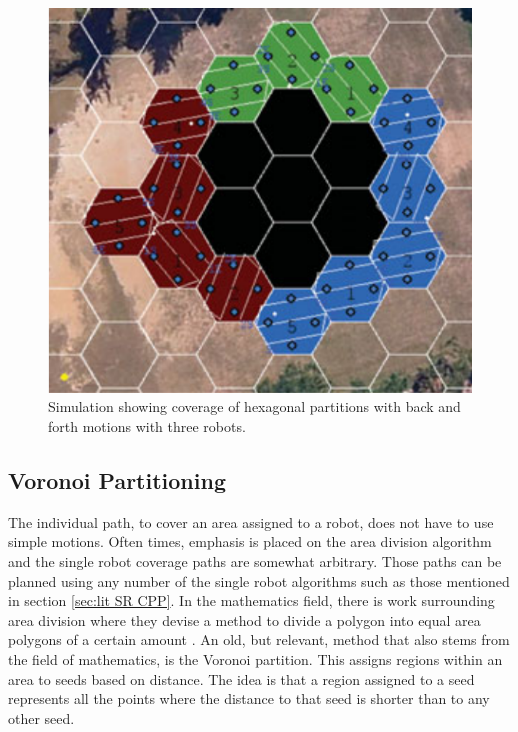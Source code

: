 \begin{figure}[h!]
	\centering
	\includegraphics[scale=0.4]{figs/Hexagonal_Partitioning_Graphic}
	\caption{Simulation showing coverage of hexagonal partitions with back and forth motions with three robots. \cite{Azpurua2018}}
	\label{fig:Hex}
\end{figure}

\subsection{Voronoi Partitioning}
The individual path, to cover an area assigned to a robot, does not have to use simple motions. Often times, emphasis is placed on the area division algorithm and the single robot coverage paths are somewhat arbitrary. Those paths can be planned using any number of the single robot algorithms such as those mentioned in section \ref{sec:lit SR CPP}. In the mathematics field, there is work surrounding area division where they devise a method to divide a polygon into equal area polygons of a certain amount \cite{Nandakumar2012}. An old, but relevant, method that also stems from the field of mathematics, is the Voronoi partition. This assigns regions within an area to seeds based on distance. The idea is that a region assigned to a seed represents all the points where the distance to that seed is shorter than to any other seed.

